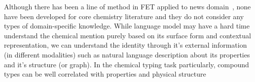 


Although there has been a line of method in FET applied to news domain~\cite{ultrafet, label_bias, fet_el, lin2019attentive,hierarchical_gcn, hyperbolic}, none have been developed for core chemistry literature and they do not consider any types of domain-specific knowledge. While language model may have a hard time understand the chemical mention purely based on its surface form and contextual representation, we can understand the identity through it's external information (in different modalities) such as natural language description about its properties and it's structure (or graph). In the chemical typing task particularly, compound types can be well correlated with properties and physical structure 

